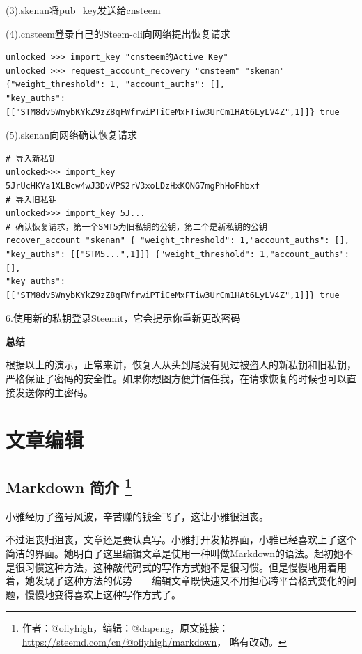 \documentclass[]{ctexbook}
\begin{document}
(3).skenan将pub\_key发送给cnsteem

(4).cnsteem登录自己的Steem-cli向网络提出恢复请求

\begin{verbatim}
unlocked >>> import_key "cnsteem的Active Key"
unlocked >>> request_account_recovery "cnsteem" "skenan" 
{"weight_threshold": 1, "account_auths": [], 
"key_auths":[["STM8dv5WnybKYkZ9zZ8qFWfrwiPTiCeMxFTiw3UrCm1HAt6LyLV4Z",1]]} true
\end{verbatim}

(5).skenan向网络确认恢复请求

\begin{verbatim}
# 导入新私钥
unlocked>>> import_key 5JrUcHKYa1XLBcw4wJ3DvVPS2rV3xoLDzHxKQNG7mgPhHoFhbxf
# 导入旧私钥
unlocked>>> import_key 5J...
# 确认恢复请求，第一个SMT5为旧私钥的公钥，第二个是新私钥的公钥
recover_account "skenan" { "weight_threshold": 1,"account_auths": [],
"key_auths": [["STM5...",1]]} {"weight_threshold": 1,"account_auths": [],
"key_auths": [["STM8dv5WnybKYkZ9zZ8qFWfrwiPTiCeMxFTiw3UrCm1HAt6LyLV4Z",1]]} true
\end{verbatim}

6.使用新的私钥登录Steemit，它会提示你重新更改密码

\textbf{总结}

根据以上的演示，正常来讲，恢复人从头到尾没有见过被盗人的新私钥和旧私钥，严格保证了密码的安全性。如果你想图方便并信任我，在请求恢复的时候也可以直接发送你的主密码。

\hypertarget{wzbjp}{%
\chapter{文章编辑}\label{wzbjp}}

\hypertarget{markdown_yf}{%
\section[Markdown 简介 ]{\texorpdfstring{Markdown 简介 \footnote{作者：@oflyhigh，编辑：@dapeng，原文链接：\url{https://steemd.com/cn/@oflyhigh/markdown}， 略有改动。}}{Markdown 简介 }}\label{markdown_yf}}

小雅经历了盗号风波，辛苦赚的钱全飞了，这让小雅很沮丧。

不过沮丧归沮丧，文章还是要认真写。小雅打开发帖界面，小雅已经喜欢上了这个简洁的界面。她明白了这里编辑文章是使用一种叫做Markdown的语法。起初她不是很习惯这种方法，这种敲代码式的写作方式她不是很习惯。但是慢慢地用着用着，她发现了这种方法的优势------编辑文章既快速又不用担心跨平台格式变化的问题，慢慢地变得喜欢上这种写作方式了。
\end{document}
